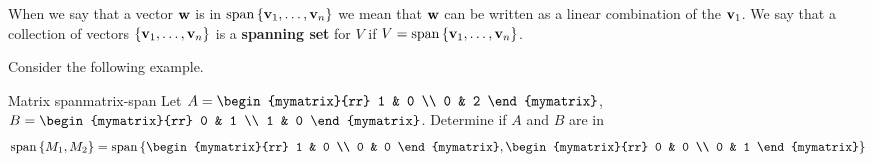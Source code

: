 When we say that a vector $\mbox{\bf w}$ is in
$\sspan\set{\vect{v}_{1},\ldots,\vect{v}_{n}}$ we mean that $\mbox{\bf w}$
can be written as a linear combination of the $\mbox{\bf v}_1$. We say
that a collection of vectors $\left\{\mbox{\bf v}_{1},\ldots,\mbox{\bf v}_{n}\right\}$
is a \textbf{spanning set} for $V$ if $V = \sspan
\set{\vect{v}_{1},\ldots,\vect{v}_{n}}$.

Consider the following example.

\begin{example}{Matrix span}{matrix-span}
  Let $A = \begin{mymatrix}{rr} 1 & 0 \\ 0 & 2 \end{mymatrix}$,
  $B = \begin{mymatrix}{rr} 0 & 1 \\ 1 & 0 \end{mymatrix}$.
  Determine if $A$ and $B$ are in
  \begin{equation*}
    \sspan\set{M_1, M_2 } = \sspan
    \set{\begin{mymatrix}{rr} 1 & 0 \\ 0 & 0 \end{mymatrix},
      \begin{mymatrix}{rr} 0 & 0 \\ 0 & 1 \end{mymatrix} }
  \end{equation*}
\end{example}

